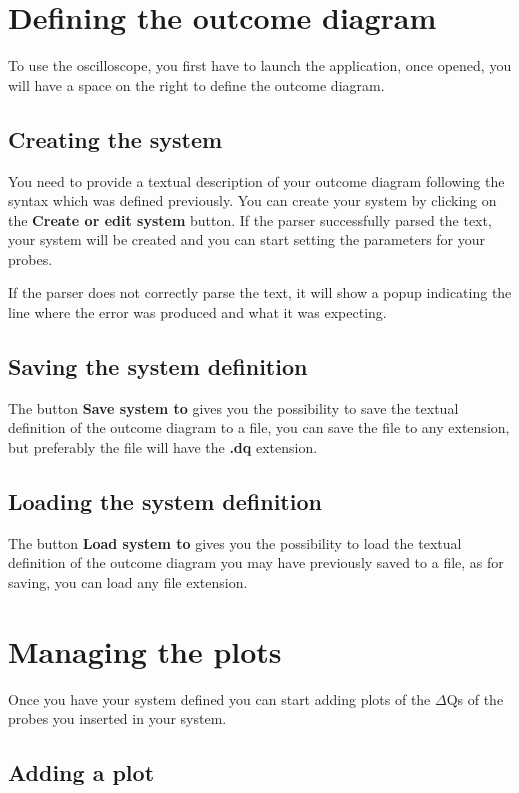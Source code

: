\section{Defining the outcome diagram}
    To use the oscilloscope, you first have to launch the application, once opened, you will have a space on the right to define the outcome diagram. 

    \subsection{Creating the system}

    You need to provide a textual description of your outcome diagram following the syntax which was defined previously.
    You can create your system by clicking on the \textbf{Create or edit system} button. If the parser successfully parsed the text, your system will be created and you can start setting the parameters for your probes.
    
    If the parser does not correctly parse the text, it will show a popup indicating the line where the error was produced and what it was expecting. 
    
    \subsection{Saving the system definition}

    The button \textbf{Save system to} gives you the possibility to save the textual definition of the outcome diagram to a file, you can save the file to any extension, but preferably the file will have the \textbf{.dq} extension.

    \subsection{Loading the system definition}

    The button \textbf{Load system to} gives you the possibility to load the textual definition of the outcome diagram you may have previously saved to a file, as for saving, you can load any file extension.

\section{Managing the plots} 
    Once you have your system defined you can start adding plots of the $\Delta$Qs of the probes you inserted in your system.
    
    \subsection{Adding a plot}

